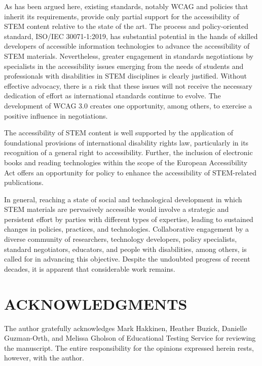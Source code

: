 \documentclass{sig-alternate} %
\begin{document}
\begin{large}
As has been argued here, existing standards, notably WCAG and policies that inherit its requirements, provide only partial support for the accessibility of STEM content relative to the state of the art. The process and policy-oriented standard, ISO/IEC 30071-1:2019, has substantial potential in the hands of skilled developers of accessible information technologies to advance the accessibility of STEM materials. Nevertheless, greater engagement in standards negotiations by specialists in the accessibility issues emerging from the needs of students and professionals with disabilities in STEM disciplines is clearly justified. Without effective advocacy, there is a risk that these issues will not receive the necessary dedication of effort as international standards continue to evolve. The development of WCAG 3.0 creates one opportunity, among others, to exercise a positive influence in negotiations.

The accessibility of STEM content is well supported by the application of foundational provisions of international disability rights law, particularly in its recognition of a general right to accessibility. Further, the inclusion of electronic books and reading technologies within the scope of the European Accessibility Act offers an opportunity for policy to enhance the accessibility of STEM-related publications.

In general, reaching a state of social and technological development in which STEM materials are pervasively accessible would involve a strategic and persistent effort by parties with different types of expertise, leading to sustained changes in policies, practices, and technologies. Collaborative engagement by a diverse community of researchers, technology developers, policy specialists, standard negotiators, educators, and people with disabilities, among others, is called for in advancing this objective. Despite the undoubted progress of recent decades, it is apparent that considerable work remains.

\section*{ACKNOWLEDGMENTS}
The author gratefully acknowledges Mark Hakkinen, Heather Buzick, Danielle Guzman-Orth, and Melissa Gholson of Educational Testing Service for reviewing the manuscript. The entire responsibility for the opinions expressed herein rests, however, with the author.

\end{large}
 
\end{document}
